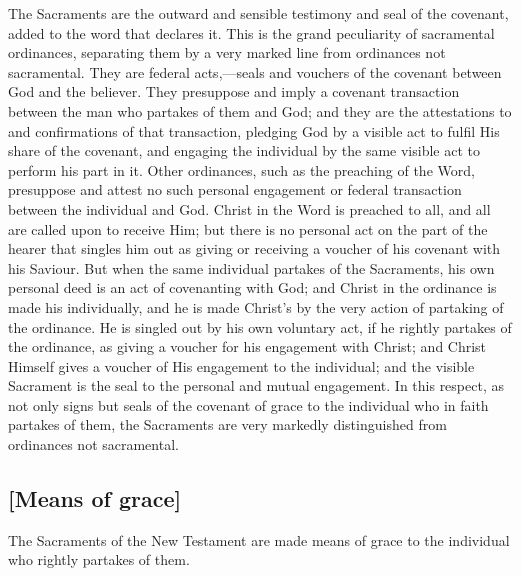 \documentclass[
]{book}
\begin{document}
The Sacraments are the outward and sensible testimony and seal of the covenant, added to the word that declares it. This is the grand peculiarity of sacramental ordinances, separating them by a very marked line from ordinances not sacramental. They are federal acts,---seals and vouchers of the covenant between God and the believer. They presuppose and imply a covenant transaction between the man who partakes of them and God; and they are the attestations to and confirmations of that transaction, pledging God by a visible act to fulfil His share of the covenant, and engaging the individual by the same visible act to perform his part in it. Other ordinances, such as the preaching of the Word, presuppose and attest no such personal engagement or federal transaction between the individual and God. Christ in the Word is preached to all, and all are called upon to receive Him; but there is no personal act on the part of the hearer that singles him out as giving or receiving a voucher of his covenant with his Saviour. But when the same individual partakes of the Sacraments, his own personal deed is an act of covenanting with God; and Christ in the ordinance is made his individually, and he is made Christ's by the very action of partaking of the ordinance. He is singled out by his own voluntary act, if he rightly partakes of the ordinance, as giving a voucher for his engagement with Christ; and Christ Himself gives a voucher of His engagement to the individual; and the visible Sacrament is the seal to the personal and mutual engagement. In this respect, as not only signs but seals of the covenant of grace to the individual who in faith partakes of them, the Sacraments are very markedly distinguished from ordinances not sacramental.

\hypertarget{means-of-grace}{%
\subsection{{[}Means of grace{]}}\label{means-of-grace}}

The Sacraments of the New Testament are made means of grace to the individual who rightly partakes of them.
\end{document}
